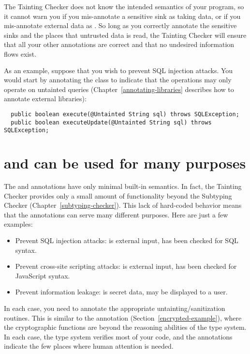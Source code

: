 The Tainting Checker does not know the intended semantics of your program,
so it cannot warn you if you mis-annotate a sensitive sink as taking
 data, or if you mis-annotate external data as
.  So long as you correctly annotate the sensitive sinks
and the places that untrusted data is read, the Tainting Checker will
ensure that all your other annotations are correct and that no undesired
information flows exist.

As an example, suppose that you wish to prevent SQL injection attacks.  You
would start by annotating the
 class to indicate that the
 operations may only operate on untainted queries
(Chapter~\ref{annotating-libraries} describes how to annotate external
libraries):

\begin{Verbatim}
  public boolean execute(@Untainted String sql) throws SQLException;
  public boolean executeUpdate(@Untainted String sql) throws SQLException; 
\end{Verbatim}


\section{ and  can be used for many purposes\label{tainting-many-uses}}

The  and  annotations have only minimal
built-in semantics.  In fact, the Tainting Checker provides only a small
amount of functionality beyond the Subtyping Checker
(Chapter~\ref{subtyping-checker}).  This lack of hard-coded behavior means that
the annotations can serve many different purposes.  Here are just a few
examples:

\begin{itemize}
\item
  Prevent SQL injection attacks:   is external input,
   has been checked for SQL syntax.
\item
  Prevent cross-site scripting attacks:   is external input,
   has been checked for JavaScript syntax.
\item
  Prevent information leakage:   is secret data, 
   may be displayed to a user.
\end{itemize}

In each case, you need to annotate the appropriate untainting/sanitization
routines.  This is similar to the  annotation
(Section~\ref{encrypted-example}), where the cryptographic functions are
beyond the reasoning abilities of the type system.  In each case, the type
system verifies most of your code, and the 
annotations indicate the few places where human attention is needed.


